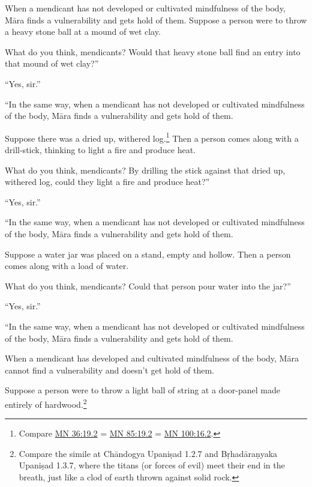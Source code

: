 \documentclass[12pt,openany]{book}%
\begin{document}
When a mendicant has not developed or cultivated mindfulness of the body, \textsanskrit{Māra} finds a vulnerability and gets hold of them. Suppose a person were to throw a heavy stone ball at a mound of wet clay. 

What do you think, mendicants? Would that heavy stone ball find an entry into that mound of wet clay?” 

“Yes, sir.” 

“In the same way, when a mendicant has not developed or cultivated mindfulness of the body, \textsanskrit{Māra} finds a vulnerability and gets hold of them. 

Suppose there was a dried up, withered log.\footnote{Compare \href{https://suttacentral.net/mn36/en/sujato\#19.2}{MN 36:19.2} = \href{https://suttacentral.net/mn85/en/sujato\#19.2}{MN 85:19.2} = \href{https://suttacentral.net/mn100/en/sujato\#16.2}{MN 100:16.2}. } Then a person comes along with a drill-stick, thinking to light a fire and produce heat. 

What do you think, mendicants? By drilling the stick against that dried up, withered log, could they light a fire and produce heat?” 

“Yes, sir.” 

“In the same way, when a mendicant has not developed or cultivated mindfulness of the body, \textsanskrit{Māra} finds a vulnerability and gets hold of them. 

Suppose a water jar was placed on a stand, empty and hollow. Then a person comes along with a load of water. 

What do you think, mendicants? Could that person pour water into the jar?” 

“Yes, sir.” 

“In the same way, when a mendicant has not developed or cultivated mindfulness of the body, \textsanskrit{Māra} finds a vulnerability and gets hold of them. 

When a mendicant has developed and cultivated mindfulness of the body, \textsanskrit{Māra} cannot find a vulnerability and doesn’t get hold of them. 

Suppose a person were to throw a light ball of string at a door-panel made entirely of hardwood.\footnote{Compare the simile at \textsanskrit{Chāndogya} \textsanskrit{Upaniṣad} 1.2.7 and \textsanskrit{Bṛhadāraṇyaka} \textsanskrit{Upaniṣad} 1.3.7, where the titans (or forces of evil) meet their end in the breath, just like a clod of earth thrown against solid rock. } 
\end{document}
